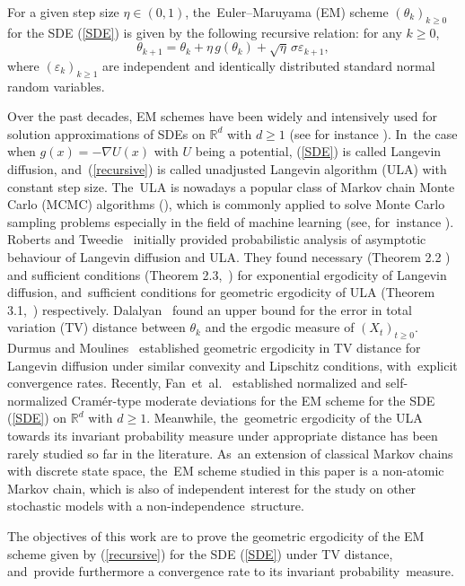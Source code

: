 \documentclass[11pt]{elsarticle}
\def\geq{\geqslant}
\def\R{\mathbb{R}}
\begin{document}
For a given step size $\eta\in(0,1)$, the~Euler--Maruyama (EM) scheme $(\theta_k)_{k\geq0}$ for the SDE  (\ref{SDE}) is given by the following recursive relation: for any $k\geq0$,
\begin{equation}\label{recursive}
	\theta_{k+1}=\theta_{k}+\eta\, g(\theta_k)+\sqrt{\eta}\,\sigma\varepsilon_{k+1},
\end{equation}
where $(\varepsilon_k)_{k\geq1}$ are independent and identically distributed standard normal random variables.

Over the past decades, EM schemes have been widely and intensively used for solution approximations of SDEs on $\R^d$ with $d\geq1$ (see for instance \cite{BJ22,BPP22,HL18,KS19,LZ24,PT17,P08,PT97}). In~the case when $g(x)=-\nabla U(x)$ with $U$ being a potential, (\ref{SDE}) is called Langevin diffusion, and~(\ref{recursive}) is called unadjusted Langevin algorithm (ULA) with constant step size. The~ULA is nowadays a popular class of Markov chain Monte Carlo (MCMC) algorithms (\cite{BGJM11}), which is commonly applied to solve Monte Carlo sampling problems especially in the field of machine learning (see, for~instance \cite{MY11,DL21}). Roberts and Tweedie~\cite{RT96} initially provided probabilistic analysis of asymptotic behaviour of Langevin diffusion and ULA. They found necessary (Theorem 2.2 {\cite{RT96}}) and sufficient conditions (Theorem 2.3,~\cite{RT96}) for exponential ergodicity of Langevin diffusion, and~sufficient conditions for geometric ergodicity of ULA (Theorem 3.1,~\cite{RT96}) respectively. Dalalyan~\cite{D17} found an upper bound for the error in total variation (TV) distance between $\theta_k$ and the ergodic measure of $(X_t)_{t\geq0}$. Durmus and Moulines~\cite{DM17} established geometric ergodicity in TV distance for Langevin diffusion under similar convexity and Lipschitz conditions, with~explicit convergence rates. Recently, Fan~et~al.~\cite{FHX24} established normalized and self-normalized Cram\'{e}r-type moderate deviations for the EM scheme for the SDE (\ref{SDE}) on $\R^d$ with $d\geq1$. Meanwhile, the~geometric ergodicity of the ULA towards its invariant probability measure under appropriate distance has been rarely studied so far in the literature. As~an extension of classical Markov chains with discrete state space, the~EM scheme studied in this paper is a non-atomic Markov chain, which is also of independent interest for the study on other stochastic models with  a non-independence~structure. 

The objectives of this work are to prove the geometric ergodicity of the EM scheme given by (\ref{recursive}) for the SDE (\ref{SDE}) under TV distance, and~provide furthermore a convergence rate to its invariant probability~measure. 
\end{document}
